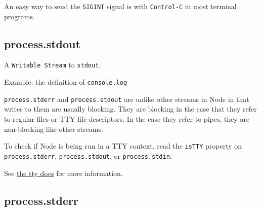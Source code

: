 An easy way to send the \texttt{SIGINT} signal is with
\texttt{Control-C} in most terminal programs.

\subsection{process.stdout}

A \texttt{Writable Stream} to \texttt{stdout}.

Example: the definition of \texttt{console.log}

\begin{Shaded}
\begin{Highlighting}[]
 \NormalTok{= }
  \NormalTok{);}
\NormalTok{\};}
\end{Highlighting}
\end{Shaded}

\texttt{process.stderr} and \texttt{process.stdout} are unlike other
streams in Node in that writes to them are usually blocking. They are
blocking in the case that they refer to regular files or TTY file
descriptors. In the case they refer to pipes, they are non-blocking like
other streams.

To check if Node is being run in a TTY context, read the \texttt{isTTY}
property on \texttt{process.stderr}, \texttt{process.stdout}, or
\texttt{process.stdin}:

\begin{Shaded}
\begin{Highlighting}[]
 

 
\end{Highlighting}
\end{Shaded}

See \href{tty.html\#tty\_tty}{the tty docs} for more information.

\subsection{process.stderr}

